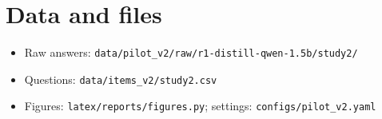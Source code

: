 \documentclass[11pt,a4paper]{article}
\begin{document}
\appendix
\section{Data and files}
\begin{itemize}[leftmargin=*]
  \item Raw answers: \texttt{data/pilot\_v2/raw/r1-distill-qwen-1.5b/study2/}
  \item Questions: \texttt{data/items\_v2/study2.csv}
  \item Figures: \texttt{latex/reports/figures.py}; settings: \texttt{configs/pilot\_v2.yaml}
\end{itemize}



\end{document}
